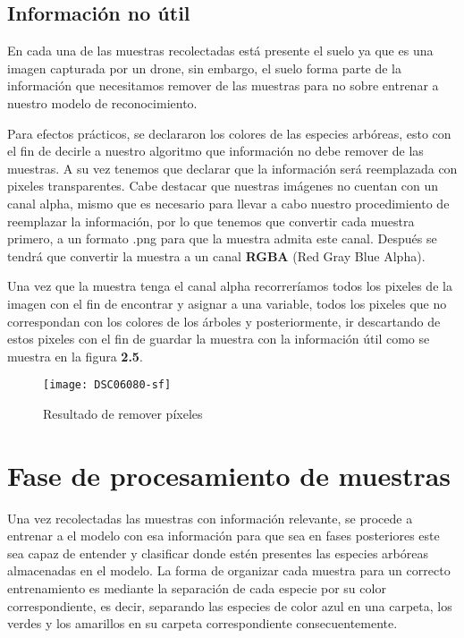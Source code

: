 \newpage

\subsection{Información no útil}
En cada una de las muestras recolectadas está presente el suelo ya que es una imagen capturada por un drone, sin embargo, el suelo forma parte de la información que necesitamos remover de las muestras para no sobre entrenar a nuestro modelo de reconocimiento.

Para efectos prácticos, se declararon los colores de las especies arbóreas, esto con el fin de decirle a nuestro algoritmo que información no debe remover de las muestras. A su vez tenemos que declarar que la información será reemplazada con pixeles transparentes. Cabe destacar que nuestras imágenes no cuentan con un canal alpha, mismo que es necesario para llevar a cabo nuestro procedimiento de reemplazar la información, por lo que tenemos que convertir cada muestra primero, a un formato .png para que la muestra admita este canal. Después se tendrá que convertir la muestra a un canal \textbf{RGBA} (Red Gray Blue Alpha).

 Una vez que la muestra tenga el canal alpha recorreríamos todos los pixeles de la imagen con el fin de encontrar y asignar a una variable, todos los pixeles que no correspondan con los colores de los árboles y posteriormente, ir descartando de estos pixeles con el fin de guardar la muestra con la información útil como se muestra en la figura \textbf{2.5}.

\begin{figure} [!b]
	\centering
	\begin{minipage}[b]{0.5\textwidth}
		\texttt{[image: DSC06080-sf]}
		\caption{Resultado de remover píxeles}
	\end{minipage}
\end{figure}

\break

\section{Fase de procesamiento de muestras}
Una vez recolectadas las muestras con información relevante, se procede a  entrenar a el modelo con esa información para que sea en fases posteriores este sea capaz de entender y clasificar donde estén presentes las especies arbóreas almacenadas en el modelo. La forma de organizar cada muestra para un correcto entrenamiento es mediante la separación de cada especie por su color correspondiente, es decir, separando las especies de color azul en una carpeta, los verdes y los amarillos en su carpeta correspondiente consecuentemente.


